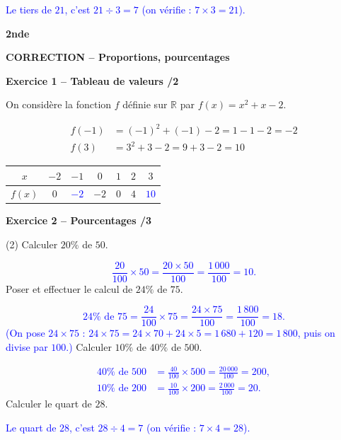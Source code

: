 \documentclass[10pt,a4paper]{article}
\renewcommand{\niveau}{2nde}
\renewcommand{\chapitre}{Proportions, pourcentages}
\renewcommand{\interroversion}[1]{
    \noindent\textbf{\niveau}

    \vspace{-0.5cm}
    \begin{center}
        \textbf{\large CORRECTION -- \chapitre}
    \end{center}

    \vspace{0.1cm}
}
\begin{document}
\begin{sujets}
\begin{tasks}
    \textcolor{blue}{Le tiers de \(21\), c'est \(21\div3=7\) (on vérifie : \(7\times3=21\)).}
\end{tasks}

\columnbreak

\interroversion{B}

\textbf{Exercice 1 -- Tableau de valeurs \hfill /2}

On considère la fonction \(f\) définie sur \(\mathbb{R}\) par \(f(x)=x^2+x-2\).

\[
\begin{aligned}
f(-1) &= (-1)^2+(-1)-2 = 1-1-2 = -2\\
f(3)  &= 3^2+3-2 = 9+3-2 = 10
\end{aligned}
\]

\begin{center}
    \renewcommand{\arraystretch}{1.5}
    \setlength{\tabcolsep}{0.25cm}
    \begin{tabular}{|*{7}{c|}}
    \hline
    \(x\) & \(-2\) & \(-1\) & \(0\) & \(1\) & \(2\) & \(3\) \\
    \hline
    \(f(x)\) & \(0\) & \textcolor{blue}{\(-2\)} & \(-2\) & \(0\) & \(4\) & \textcolor{blue}{\(10\)} \\
    \hline
    \end{tabular}
\end{center}

\textbf{Exercice 2 -- Pourcentages \hfill /3}

\begin{tasks}(2)
    \task Calculer \(20\%\) de \(50\).

    \textcolor{blue}{
    \[
    \frac{20}{100}\times 50 = \frac{20\times 50}{100} = \frac{1\,000}{100} = 10.
    \]}
    \task Poser et effectuer le calcul de \(24\%\) de \(75\).

    \textcolor{blue}{
    \[
    24\%\text{ de }75 = \frac{24}{100}\times 75 = \frac{24\times 75}{100} = \frac{1\,800}{100} = 18.
    \]
    (On pose \(24\times75\) : \(24\times75=24\times70+24\times5=1\,680+120=1\,800\), puis on divise par \(100\).)}
    \task Calculer \(10\%\) de \(40\%\) de \(500\).

    \textcolor{blue}{
    \[
    \begin{aligned}
    40\%\text{ de }500 &=\frac{40}{100}\times500=\frac{20\,000}{100}=200,\\
    10\%\text{ de }200 &=\frac{10}{100}\times200=\frac{2\,000}{100}=20.
    \end{aligned}
    \]}
    \task Calculer le quart de \(28\).

    \textcolor{blue}{Le quart de \(28\), c'est \(28\div4=7\) (on vérifie : \(7\times4=28\)).}
\end{tasks}

\end{sujets}
\end{document}
